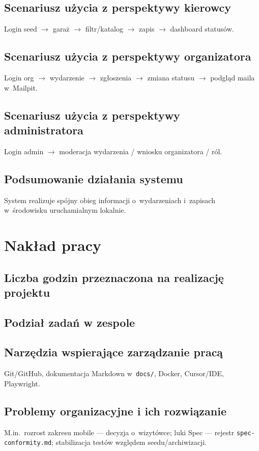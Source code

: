 \documentclass{sprz}
\begin{document}
\section{Scenariusz użycia z perspektywy kierowcy}
Login seed $\rightarrow$ garaż $\rightarrow$ filtr/katalog $\rightarrow$ zapis $\rightarrow$ dashboard statusów.
\section{Scenariusz użycia z perspektywy organizatora}
Login org $\rightarrow$ wydarzenie $\rightarrow$ zgłoszenia $\rightarrow$ zmiana statusu $\rightarrow$ podgląd maila w~Mailpit.
\section{Scenariusz użycia z perspektywy administratora}
Login admin $\rightarrow$ moderacja wydarzenia / wniosku organizatora / ról.
\section{Podsumowanie działania systemu}
System realizuje spójny obieg informacji o~wydarzeniach i~zapisach w~środowisku uruchamialnym lokalnie.

\chapter{Nakład pracy}
\section{Liczba godzin przeznaczona na realizację projektu}
\section{Podział zadań w zespole}
\section{Narzędzia wspierające zarządzanie pracą}
Git/GitHub, dokumentacja Markdown w~\texttt{docs/}, Docker, Cursor/IDE, Playwright.
\section{Problemy organizacyjne i ich rozwiązanie}
M.in.\ rozrost zakresu mobile --- decyzja o~wizytówce; luki Spec --- rejestr \texttt{spec-conformity.md}; stabilizacja testów względem seedu/archiwizacji.
\end{document}
